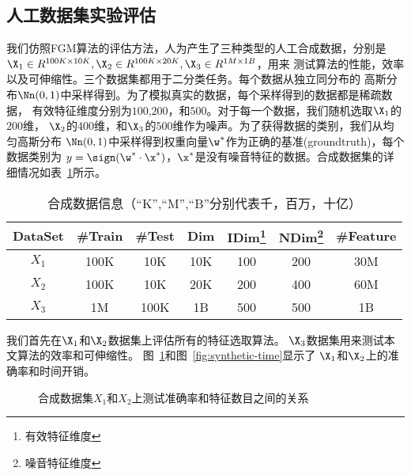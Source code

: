 \subsection{人工数据集实验评估}
我们仿照FGM算法的评估方法，人为产生了三种类型的人工合成数据，分别是$\X_1 \in
R^{100K\times 10K}, \X_2 \in R^{100K\times 20K}, \X_3 \in R^{1M\times1B}$，用来
测试算法的性能，效率以及可伸缩性。三个数据集都用于二分类任务。每个数据从独立同分布的
高斯分布$\Nn(0,1)$中采样得到。为了模拟真实的数据，每个采样得到的数据都是稀疏数据，
有效特征维度分别为$100$,$200$，和$500$。对于每一个数据，我们随机选取$\X_1$的$200$维，
$\X_2$的$400$维，和$\X_3$的$500$维作为噪声。为了获得数据的类别，我们从均匀高斯分布
$\Nn(0,1)$中采样得到权重向量$\w^*$作为正确的基准(groundtruth)，每个数据类别为
$y=\sign(\w^*\cdot\x^*)$，$\x^*$是没有噪音特征的数据。合成数据集的详细情况如表~\ref{tab:synthetic-datasets}所示。

\begin{table}[htbp]
\caption{合成数据信息（``K'',``M'',``B''分别代表千，百万，十亿）}
\label{tab:synthetic-datasets}
\begin{center}
    \begin{minipage}{11cm}
        \begin{tabular}{|c|c|c|c|c|c|c|}
            \hline
            DataSet & \#Train & \#Test & Dim & IDim\footnote{有效特征维度} &
            NDim\footnote{噪音特征维度} & \#Feature \\
            \hline
            $X_1$ & 100K & 10K & 10K & 100 & 200 & 30M \\
            $X_2$ & 100K & 10K & 20K & 200 & 400 & 60M \\
            $X_3$ & 1M & 100K & 1B & 500 & 500 & 1B \\
            \hline
        \end{tabular}
    \end{minipage}
\end{center}
\end{table}

我们首先在$\X_1$和$\X_2$数据集上评估所有的特征选取算法。
$\X_3$数据集用来测试本文算法的效率和可伸缩性。
图~\ref{fig:synthetic-accuracy}和图~\ref{fig:synthetic-time}显示了
$\X_1$和$\X_2$上的准确率和时间开销。
\begin{figure}[t]
    \centerline{
    }
    \caption{合成数据集$X_1$和$X_2$上测试准确率和特征数目之间的关系}
    \label{fig:synthetic-accuracy}
\end{figure}


